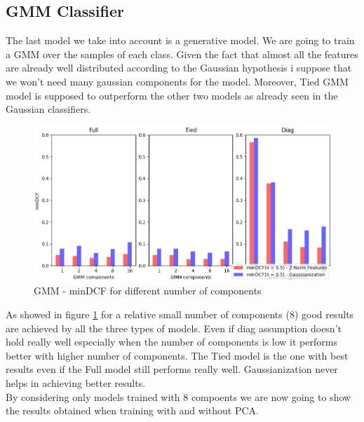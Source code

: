 \documentclass[10pt, a4paper, twocolumn]{article} %
\begin{document}
\subsection{GMM Classifier}
The last model we take into account is a generative model. We are going to train a GMM
over the samples of each class. Given the fact that almost all the features are already well
distributed according to the Gaussian hypothesis i suppose that we won't need many gaussian 
components for the model. Moreover, Tied GMM model is supposed to outperform the other two
models as already seen in the Gaussian classifiers.
\begin{figure}[ht!]
	\includegraphics[width=\linewidth]{./Pictures/FeaturesAnalysis/gmmhist.png}
	\caption{GMM - minDCF for different number of components}
	\label{gmmhist} 
\end{figure}
As showed in figure \ref{gmmhist} for a relative small number of components (8) good results are
achieved by all the three types of models. Even if diag assumption doesn't hold really well
especially when the number of components is low it performs better with higher number of 
components. The Tied model is the one with best results even if the Full model still performs really
well. Gaussianization never helps in achieving better results. \\By considering only models trained
with 8 compoents we are now going to show the results obtained when training with and
without PCA.
\end{document}
